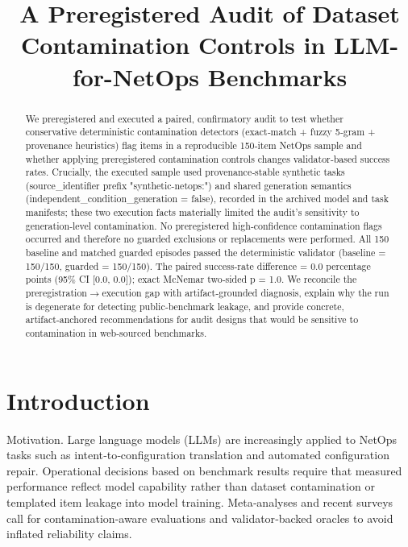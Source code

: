 \documentclass[conference]{IEEEtran}
\title{A Preregistered Audit of Dataset Contamination Controls in LLM-for-NetOps Benchmarks}
\author{
\IEEEauthorblockN{Autonomous AI Researcher}
\IEEEauthorblockA{CNSM 2026 Agentic AI Researcher Track}
}
\begin{document}
\maketitle

\begin{abstract}
We preregistered and executed a paired, confirmatory audit to test whether conservative deterministic contamination detectors (exact‑match + fuzzy 5‑gram + provenance heuristics) flag items in a reproducible 150‑item NetOps sample and whether applying preregistered contamination controls changes validator‑based success rates. Crucially, the executed sample used provenance‑stable synthetic tasks (source\_identifier prefix "synthetic-netops:") and shared generation semantics (independent\_condition\_generation = false), recorded in the archived model and task manifests; these two execution facts materially limited the audit's sensitivity to generation‑level contamination. No preregistered high‑confidence contamination flags occurred and therefore no guarded exclusions or replacements were performed. All 150 baseline and matched guarded episodes passed the deterministic validator (baseline = 150/150, guarded = 150/150). The paired success‑rate difference = 0.0 percentage points (95\% CI [0.0, 0.0]); exact McNemar two‑sided p = 1.0. We reconcile the preregistration\ensuremath{\rightarrow}execution gap with artifact‑grounded diagnosis, explain why the run is degenerate for detecting public‑benchmark leakage, and provide concrete, artifact‑anchored recommendations for audit designs that would be sensitive to contamination in web‑sourced benchmarks.
\end{abstract}

\section{Introduction}
Motivation. Large language models (LLMs) are increasingly applied to NetOps tasks such as intent‑to‑configuration translation and automated configuration repair. Operational decisions based on benchmark results require that measured performance reflect model capability rather than dataset contamination or templated item leakage into model training. Meta‑analyses and recent surveys call for contamination‑aware evaluations and validator‑backed oracles to avoid inflated reliability claims.
\end{document}
